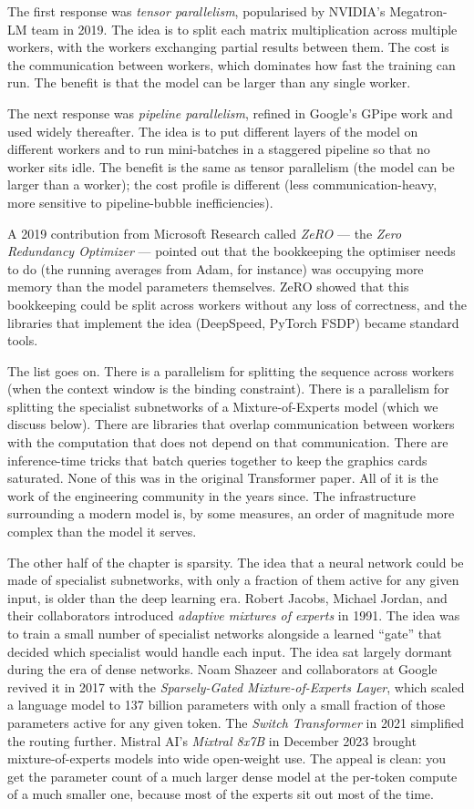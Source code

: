 The first response was \emph{tensor parallelism}, popularised
by NVIDIA's Megatron-LM team in 2019. The idea is to split each
matrix multiplication across multiple workers, with the workers
exchanging partial results between them. The cost is the
communication between workers, which dominates how fast the
training can run. The benefit is that the model can be larger
than any single worker.

The next response was \emph{pipeline parallelism}, refined in
Google's GPipe work and used widely thereafter. The idea is to
put different layers of the model on different workers and to
run mini-batches in a staggered pipeline so that no worker sits
idle. The benefit is the same as tensor parallelism (the model
can be larger than a worker); the cost profile is different
(less communication-heavy, more sensitive to pipeline-bubble
inefficiencies).

A 2019 contribution from Microsoft Research called
\emph{ZeRO} --- the \emph{Zero Redundancy Optimizer} --- pointed
out that the bookkeeping the optimiser needs to do (the running
averages from Adam, for instance) was occupying more memory
than the model parameters themselves. ZeRO showed that this
bookkeeping could be split across workers without any loss of
correctness, and the libraries that implement the idea
(DeepSpeed, PyTorch FSDP) became standard tools.

The list goes on. There is a parallelism for splitting the
sequence across workers (when the context window is the
binding constraint). There is a parallelism for splitting the
specialist subnetworks of a Mixture-of-Experts model (which we
discuss below). There are libraries that overlap communication
between workers with the computation that does not depend on
that communication. There are inference-time tricks that batch
queries together to keep the graphics cards saturated. None of
this was in the original Transformer paper. All of it is the
work of the engineering community in the years since. The
infrastructure surrounding a modern model is, by some measures,
an order of magnitude more complex than the model it serves.

The other half of the chapter is sparsity. The idea that a
neural network could be made of specialist subnetworks, with
only a fraction of them active for any given input, is older
than the deep learning era. Robert Jacobs, Michael Jordan, and
their collaborators introduced \emph{adaptive mixtures of
experts} in 1991. The idea was to train a small number of
specialist networks alongside a learned ``gate'' that decided
which specialist would handle each input. The idea sat largely
dormant during the era of dense networks. Noam Shazeer and
collaborators at Google revived it in 2017 with the
\emph{Sparsely-Gated Mixture-of-Experts Layer}, which scaled a
language model to 137 billion parameters with only a small
fraction of those parameters active for any given token. The
\emph{Switch Transformer} in 2021 simplified the routing
further. Mistral AI's \emph{Mixtral 8x7B} in December 2023 brought
mixture-of-experts models into wide open-weight use. The
appeal is clean: you get the parameter count of a much larger
dense model at the per-token compute of a much smaller one,
because most of the experts sit out most of the time.

